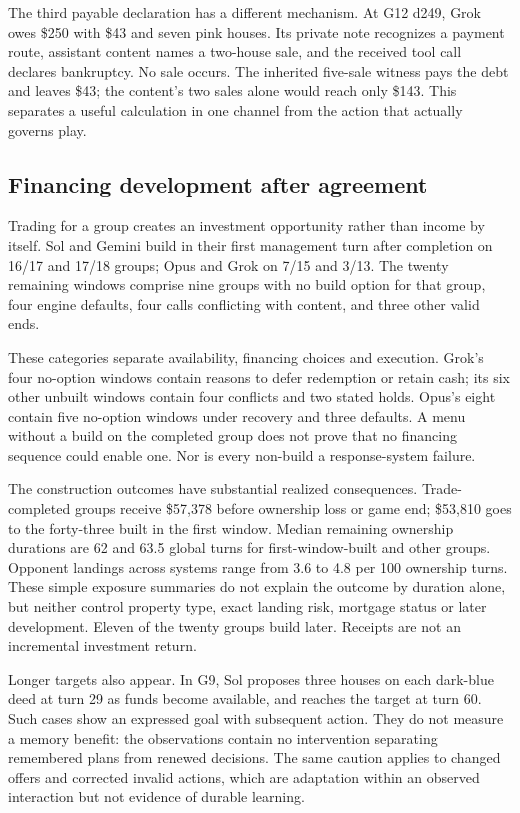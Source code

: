 The third payable declaration has a different mechanism. At G12 d249, Grok owes \$250 with \$43 and seven pink houses. Its private note recognizes a payment route, assistant content names a two-house sale, and the received tool call declares bankruptcy. No sale occurs. The inherited five-sale witness pays the debt and leaves \$43; the content's two sales alone would reach only \$143. This separates a useful calculation in one channel from the action that actually governs play.

\subsection{Financing development after agreement}
Trading for a group creates an investment opportunity rather than income by itself. Sol and Gemini build in their first management turn after completion on 16/17 and 17/18 groups; Opus and Grok on 7/15 and 3/13. The twenty remaining windows comprise nine groups with no build option for that group, four engine defaults, four calls conflicting with content, and three other valid ends.

These categories separate availability, financing choices and execution. Grok's four no-option windows contain reasons to defer redemption or retain cash; its six other unbuilt windows contain four conflicts and two stated holds. Opus's eight contain five no-option windows under recovery and three defaults. A menu without a build on the completed group does not prove that no financing sequence could enable one. Nor is every non-build a response-system failure.

The construction outcomes have substantial realized consequences. Trade-completed groups receive \$57,378 before ownership loss or game end; \$53,810 goes to the forty-three built in the first window. Median remaining ownership durations are 62 and 63.5 global turns for first-window-built and other groups. Opponent landings across systems range from 3.6 to 4.8 per 100 ownership turns. These simple exposure summaries do not explain the outcome by duration alone, but neither control property type, exact landing risk, mortgage status or later development. Eleven of the twenty groups build later. Receipts are not an incremental investment return.

Longer targets also appear. In G9, Sol proposes three houses on each dark-blue deed at turn 29 as funds become available, and reaches the target at turn 60. Such cases show an expressed goal with subsequent action. They do not measure a memory benefit: the observations contain no intervention separating remembered plans from renewed decisions. The same caution applies to changed offers and corrected invalid actions, which are adaptation within an observed interaction but not evidence of durable learning.

